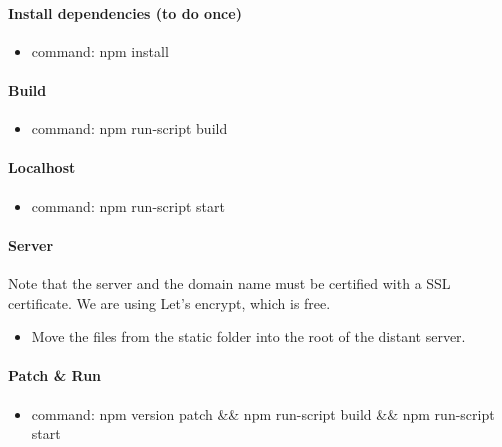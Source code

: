\paragraph{Install dependencies (to do once)}
\begin{itemize}
\item command: npm install
\end{itemize}

\paragraph{Build}
\begin{itemize}
\item command: npm run-script build
\end{itemize}

\paragraph{Localhost}
\begin{itemize}
\item command: npm run-script start
\end{itemize}

\paragraph{Server} Note that the server and the domain name must be certified with a SSL certificate. We are using Let's encrypt\cite{LetsEncrypt}, which is free. 
\begin{itemize}
\item Move the files from the static folder into the root of the distant server. 
\end{itemize}

\paragraph{Patch \& Run}
\begin{itemize}
\item command: npm version patch \&\& npm run-script build \&\& npm run-script start
\end{itemize}


